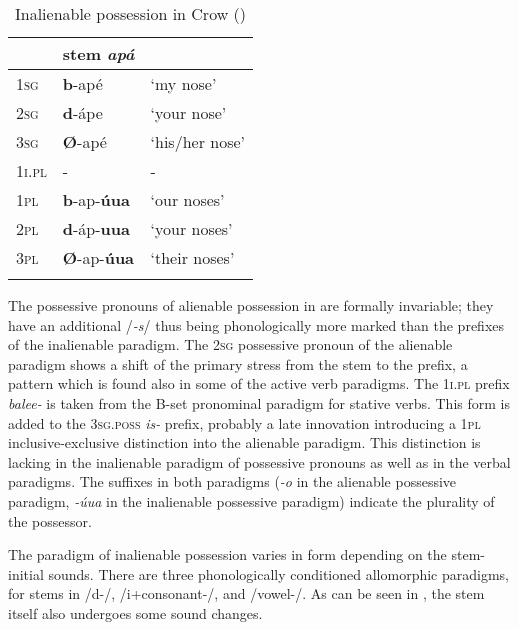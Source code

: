 \documentclass[output=paper]{LSP/langsci}
\begin{document}
\begin{table}
\caption{Inalienable possession in Crow (\citealt[52]{Graczyk2007})} \label{crowinalienablepossession}
\begin{tabular}{ l l l }
\lsptoprule
& stem \textit{apá}  & \\
\midrule	
\textsc{1sg} & \textbf{b}-apé & `my nose' \\
 
\textsc{2sg} & \textbf{d}-ápe	 & `your nose' \\
 
\textsc{3sg} & \textbf{Ø}-apé & `his/her nose' \\
 
\textsc{1i.pl}	& -	& - \\
 
\textsc{1pl} & \textbf{b}-ap-\textbf{úua}	& `our noses' \\
 
\textsc{2pl} & \textbf{d}-áp-\textbf{uua}	& `your noses' \\
 
\textsc{3pl} & \textbf{Ø}-ap-\textbf{úua}	& `their noses' \\
\lspbottomrule
\end{tabular}
\end{table}

The possessive pronouns of alienable possession in  are formally invariable; they have an additional /\textit{-s}/ thus being phonologically more marked than the prefixes of the inalienable paradigm. The \textsc{2sg} possessive pronoun of the alienable paradigm shows a shift of the primary stress from the stem to the prefix, a pattern which is found also in some of the active verb paradigms. The \textsc{1i.pl} prefix \textit{balee-} is taken from the B-set pronominal paradigm for stative verbs. This form is added to the \textsc{3sg.poss} \textit{is-} prefix, probably a late innovation introducing a \textsc{1pl} inclusive-exclusive distinction into the alienable paradigm. This distinction is lacking in the inalienable paradigm of possessive pronouns as well as in the verbal paradigms. The suffixes in both paradigms (\textit{-o} in the alienable possessive paradigm, \textit{-úua} in the inalienable possessive paradigm) indicate the plurality of the possessor.

The paradigm of inalienable possession varies in form depending on the stem-initial sounds. There are three phonologically conditioned allomorphic paradigms, for stems in /d-/, /i+consonant-/, and /vowel-/. As can be seen in , the stem itself also undergoes some sound changes.
\end{document}
